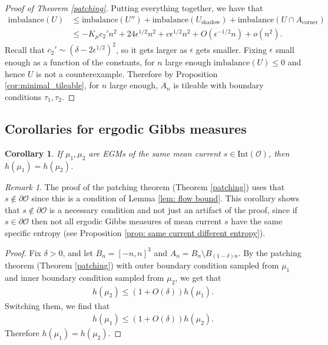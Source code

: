 \documentclass[11pt]{article}
\newtheorem{cor}[thm]{Corollary}
\theoremstyle{remark}
\newtheorem{rem}[thm]{Remark}
\theoremstyle{definition}
\newcommand{\mc}[1]{\mathcal{#1}}
\begin{document}
\begin{proof}[Proof of Theorem \ref{patching}]
Putting everything together, we have that 
    \begin{align*}
        \text{imbalance}(U) &\leq \text{imbalance}(U'') + \text{imbalance}(U_{\text{shadow}}) + \text{imbalance}(U\cap A_{\text{corner}})\\
        &\leq- K_\mu c_2' n^2 + 24\epsilon^{1/2} n^2 + c \epsilon^{1/2} n^2 + O(\epsilon^{-1/2} n) + o(n^2). 
    \end{align*}
    Recall that $c_2'\sim (\delta-2\epsilon^{1/2})^2$, so it gets larger as $\epsilon$ gets smaller. Fixing $\epsilon$ small enough as a function of the constants, for $n$ large enough $\text{imbalance}(U)\leq 0$ and hence $U$ is not a counterexample. Therefore by Proposition \ref{cor:minimal_tileable}, for $n$ large enough, $A_n$ is tileable with boundary conditions $\tau_1,\tau_2$.
\end{proof}

\subsection{Corollaries for ergodic Gibbs measures}\label{sec: patching ergodic}


\begin{cor}\label{cor:entsame}
If $\mu_1,\mu_2$ are EGMs of the same mean current $s\in \text{Int}(\mc O)$, then $h(\mu_1) = h(\mu_2)$.
\end{cor}
\begin{rem}
The proof of the patching theorem (Theorem \ref{patching}) uses that $ {s}\not \in \partial \mc O$ since this is a condition of Lemma \ref{lem: flow bound}. This corollary shows that $s\not\in \partial \mc O$ is a necessary condition and not just an artifact of the proof, since if $s\in \mc \partial \mc O$ then not all ergodic Gibbs measures of mean current $s$ have the same specific entropy (see Proposition \ref{prop: same current different entropy}). 
\end{rem}
\begin{proof}
Fix $\delta>0$, and let $B_n = [-n,n]^3$ and $A_n = B_n\setminus B_{(1-\delta)n}$. By the patching theorem (Theorem \ref{patching}) with outer boundary condition sampled from $\mu_1$ and inner boundary condition sampled from $\mu_2$, we get that 
\begin{align*}
    h(\mu_2) \leq (1+O(\delta)) h(\mu_1).
\end{align*}
Switching them, we find that 
\begin{align*}
    h(\mu_1)\leq (1+O(\delta)) h(\mu_2). 
\end{align*}
Therefore $h(\mu_1) = h(\mu_2)$. 
\end{proof}
\end{document}
